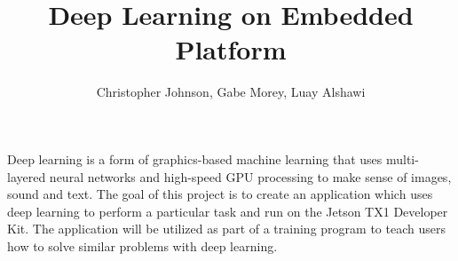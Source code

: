 \documentclass[letterpaper,10pt]{article}
\author{Christopher Johnson, Gabe Morey, Luay Alshawi}
\begin{document}
\title{Deep Learning on Embedded Platform}
\date{}
\maketitle
\begin{abstract}
\end{abstract}
Deep learning is a form of graphics-based machine learning that uses multi-layered neural networks and high-speed GPU processing to make sense of images, sound and text. The goal of this project is to create an application which uses deep learning to perform a particular task and run on the Jetson TX1 Developer Kit. The application will be utilized as part of a training program to teach users how to solve similar problems with deep learning.
\end{document}
